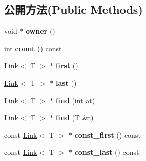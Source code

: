 \subsection*{公開方法(Public Methods)}
\begin{DoxyCompactItemize}
\item 
void $\ast$ {\bfseries owner} ()\hypertarget{class_magnum_1_1_list_acf3562945e9a66deaee2a6e0a30e557b}{}\label{class_magnum_1_1_list_acf3562945e9a66deaee2a6e0a30e557b}

\item 
int {\bfseries count} () const \hypertarget{class_magnum_1_1_list_adb5a05f628570b210cef736dca505741}{}\label{class_magnum_1_1_list_adb5a05f628570b210cef736dca505741}

\item 
\hyperlink{class_magnum_1_1_link}{Link}$<$ T $>$ $\ast$ {\bfseries first} ()\hypertarget{class_magnum_1_1_list_a350f730400c1c71a09c2e4b7f8072fd7}{}\label{class_magnum_1_1_list_a350f730400c1c71a09c2e4b7f8072fd7}

\item 
\hyperlink{class_magnum_1_1_link}{Link}$<$ T $>$ $\ast$ {\bfseries last} ()\hypertarget{class_magnum_1_1_list_a937613404ee709968e11c952ae96ebba}{}\label{class_magnum_1_1_list_a937613404ee709968e11c952ae96ebba}

\item 
\hyperlink{class_magnum_1_1_link}{Link}$<$ T $>$ $\ast$ {\bfseries find} (int at)\hypertarget{class_magnum_1_1_list_a009cd04ab16df184aa569ff9ecc50338}{}\label{class_magnum_1_1_list_a009cd04ab16df184aa569ff9ecc50338}

\item 
\hyperlink{class_magnum_1_1_link}{Link}$<$ T $>$ $\ast$ {\bfseries find} (T \&t)\hypertarget{class_magnum_1_1_list_a2824ee770199fef6e0ea69cf6149ac4e}{}\label{class_magnum_1_1_list_a2824ee770199fef6e0ea69cf6149ac4e}

\item 
const \hyperlink{class_magnum_1_1_link}{Link}$<$ T $>$ $\ast$ {\bfseries const\+\_\+first} () const \hypertarget{class_magnum_1_1_list_a2c67babcb6dac732653ed3b4f20544f4}{}\label{class_magnum_1_1_list_a2c67babcb6dac732653ed3b4f20544f4}

\item 
const \hyperlink{class_magnum_1_1_link}{Link}$<$ T $>$ $\ast$ {\bfseries const\+\_\+last} () const \hypertarget{class_magnum_1_1_list_a752769d830c426978ce100add2faccf8}{}\label{class_magnum_1_1_list_a752769d830c426978ce100add2faccf8}


\end{DoxyCompactItemize}
